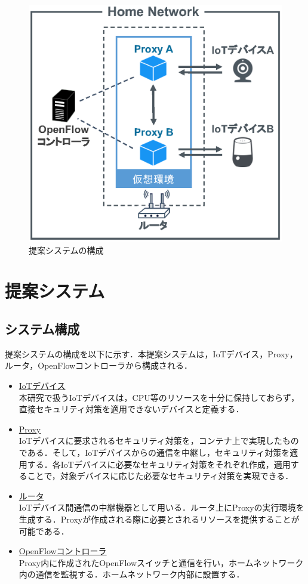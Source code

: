 \documentclass[a4paper,10pt,twocolumn,uplatex]{jsarticle}
\begin{document}
\begin{figure}[!tb]
  \centering
  \includegraphics[width=\linewidth]{img/system.eps}
  \caption{提案システムの構成}
  \label{fig:system}
\end{figure}

\section{提案システム}
\subsection{システム構成}
提案システムの構成を以下に示す．本提案システムは，IoTデバイス，Proxy，ルータ，OpenFlowコントローラから構成される．
\begin{itemize}
  \item \underline{IoTデバイス}\mbox{}\\
        本研究で扱うIoTデバイスは，CPU等のリソースを十分に保持しておらず，直接セキュリティ対策を適用できないデバイスと定義する．
  \item \underline{Proxy}\mbox{}\\
        IoTデバイスに要求されるセキュリティ対策を，コンテナ上で実現したものである．そして，IoTデバイスからの通信を中継し，セキュリティ対策を適用する．各IoTデバイスに必要なセキュリティ対策をそれぞれ作成，適用することで，対象デバイスに応じた必要なセキュリティ対策を実現できる．
  \item \underline{ルータ}\mbox{}\\
        IoTデバイス間通信の中継機器として用いる．ルータ上にProxyの実行環境を生成する．Proxyが作成される際に必要とされるリソースを提供することが可能である．
  \item \underline{OpenFlowコントローラ}\mbox{}\\
        Proxy内に作成されたOpenFlowスイッチと通信を行い，ホームネットワーク内の通信を監視する．ホームネットワーク内部に設置する．
\end{itemize}
\end{document}
